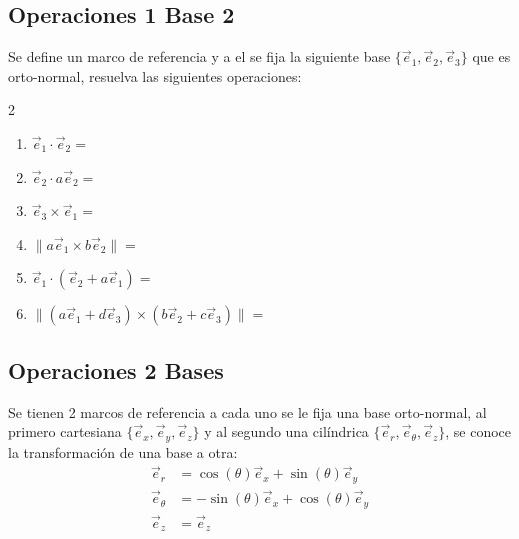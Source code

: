 \subsection*{Operaciones 1 Base 2}
  
Se define un marco de referencia y a el se fija la siguiente base $\{\Vec{e}_1,\Vec{e}_2,\Vec{e}_3\}$ que es orto-normal, resuelva las siguientes operaciones:
\begin{multicols}{2}
\begin{enumerate}
    \item$\Vec{e}_1\cdot\Vec{e}_2=$
    \item$\Vec{e}_2\cdot a\Vec{e}_2=$
    \item$\Vec{e}_3\times \Vec{e}_1=$
    \item$\|a\Vec{e}_1\times b\Vec{e}_2\|=$
    \item$\Vec{e}_1\cdot (\Vec{e}_2+a\Vec{e}_1 )=$
    \item$\|(a\Vec{e}_1+d\Vec{e}_3)\times (b\Vec{e}_2+c\Vec{e}_3)\|=$
\end{enumerate}
\end{multicols}
\subsection*{Operaciones 2 Bases}

Se tienen 2 marcos de referencia a cada uno  se le fija una base orto-normal, al primero cartesiana $\{\Vec{e}_x,\Vec{e}_y,\Vec{e}_z\}$ y al segundo una cilíndrica $\{\Vec{e}_r,\Vec{e}_\theta,\Vec{e}_z\}$, se conoce la transformación de una base a otra: 
\begin{equation*}
\begin{split}
    \Vec{e}_r&=\cos(\theta)\Vec{e}_x+\sin(\theta)\Vec{e}_y\\
    \Vec{e}_\theta&=-\sin(\theta)\Vec{e}_x+\cos(\theta)\Vec{e}_y\\
    \Vec{e}_z&=\Vec{e}_z
\end{split}
\end{equation*}

